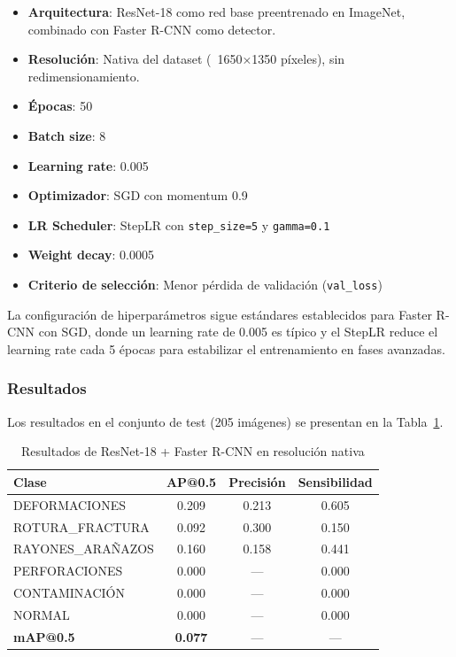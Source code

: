 \begin{itemize}
    \item \textbf{Arquitectura}: ResNet-18 como red base preentrenado en ImageNet, combinado con Faster R-CNN como detector.
    \item \textbf{Resolución}: Nativa del dataset (~1650×1350 píxeles), sin redimensionamiento.
    \item \textbf{Épocas}: 50
    \item \textbf{Batch size}: 8
    \item \textbf{Learning rate}: 0.005
    \item \textbf{Optimizador}: SGD con momentum 0.9
    \item \textbf{LR Scheduler}: StepLR con \texttt{step\_size=5} y \texttt{gamma=0.1}
    \item \textbf{Weight decay}: 0.0005
    \item \textbf{Criterio de selección}: Menor pérdida de validación (\texttt{val\_loss})
\end{itemize}

La configuración de hiperparámetros sigue estándares establecidos para Faster R-CNN con SGD, donde un learning rate de 0.005 es típico y el StepLR reduce el learning rate cada 5 épocas para estabilizar el entrenamiento en fases avanzadas.

\subsubsection{Resultados}

Los resultados en el conjunto de test (205 imágenes) se presentan en la Tabla~\ref{tab:resnet18_nativa}.

\begin{table}[htbp]
\centering
\begin{tabular}{lccc}
\toprule
\textbf{Clase} & \textbf{AP@0.5} & \textbf{Precisión} & \textbf{Sensibilidad} \\
\midrule
DEFORMACIONES & 0.209 & 0.213 & 0.605 \\
\mbox{ROTURA\_FRACTURA} & 0.092 & 0.300 & 0.150 \\
\mbox{RAYONES\_ARAÑAZOS} & 0.160 & 0.158 & 0.441 \\
PERFORACIONES & 0.000 & --- & 0.000 \\
CONTAMINACIÓN & 0.000 & --- & 0.000 \\
NORMAL & 0.000 & --- & 0.000 \\
\midrule
\textbf{mAP@0.5} & \textbf{0.077} & --- & --- \\
\bottomrule
\end{tabular}
\caption{Resultados de ResNet-18 + Faster R-CNN en resolución nativa}
\label{tab:resnet18_nativa}
\end{table}

